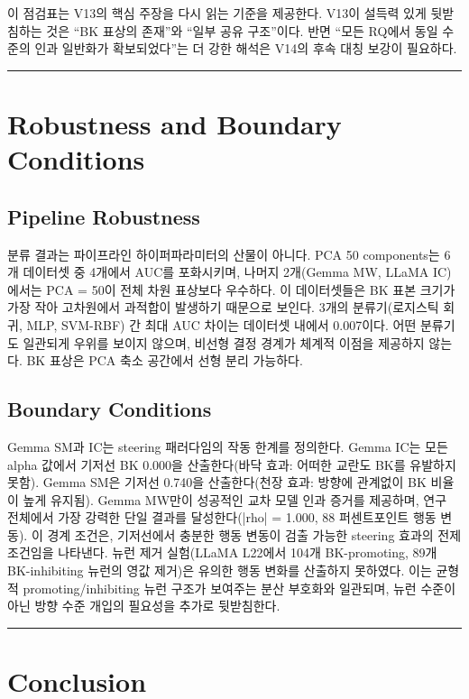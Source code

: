 \documentclass[11pt,a4paper]{article}
\begin{document}
이 점검표는 V13의 핵심 주장을 다시 읽는 기준을 제공한다. V13이 설득력 있게 뒷받침하는 것은 ``BK 표상의 존재''와 ``일부 공유 구조''이다. 반면 ``모든 RQ에서 동일 수준의 인과 일반화가 확보되었다''는 더 강한 해석은 V14의 후속 대칭 보강이 필요하다.

\bigskip\hrule\bigskip

\section{Robustness and Boundary Conditions}

\subsection{Pipeline Robustness}

분류 결과는 파이프라인 하이퍼파라미터의 산물이 아니다. PCA 50 components는 6개 데이터셋 중 4개에서 AUC를 포화시키며, 나머지 2개(Gemma MW, LLaMA IC)에서는 PCA = 50이 전체 차원 표상보다 우수하다. 이 데이터셋들은 BK 표본 크기가 가장 작아 고차원에서 과적합이 발생하기 때문으로 보인다. 3개의 분류기(로지스틱 회귀, MLP, SVM-RBF) 간 최대 AUC 차이는 데이터셋 내에서 0.007이다. 어떤 분류기도 일관되게 우위를 보이지 않으며, 비선형 결정 경계가 체계적 이점을 제공하지 않는다. BK 표상은 PCA 축소 공간에서 선형 분리 가능하다.

\subsection{Boundary Conditions}

Gemma SM과 IC는 steering 패러다임의 작동 한계를 정의한다. Gemma IC는 모든 alpha 값에서 기저선 BK 0.000을 산출한다(바닥 효과: 어떠한 교란도 BK를 유발하지 못함). Gemma SM은 기저선 0.740을 산출한다(천장 효과: 방향에 관계없이 BK 비율이 높게 유지됨). Gemma MW만이 성공적인 교차 모델 인과 증거를 제공하며, 연구 전체에서 가장 강력한 단일 결과를 달성한다(|rho| = 1.000, 88 퍼센트포인트 행동 변동). 이 경계 조건은, 기저선에서 충분한 행동 변동이 검출 가능한 steering 효과의 전제조건임을 나타낸다. 뉴런 제거 실험(LLaMA L22에서 104개 BK-promoting, 89개 BK-inhibiting 뉴런의 영값 제거)은 유의한 행동 변화를 산출하지 못하였다. 이는 균형적 promoting/inhibiting 뉴런 구조가 보여주는 분산 부호화와 일관되며, 뉴런 수준이 아닌 방향 수준 개입의 필요성을 추가로 뒷받침한다.

\bigskip\hrule\bigskip

\section{Conclusion}
\end{document}
